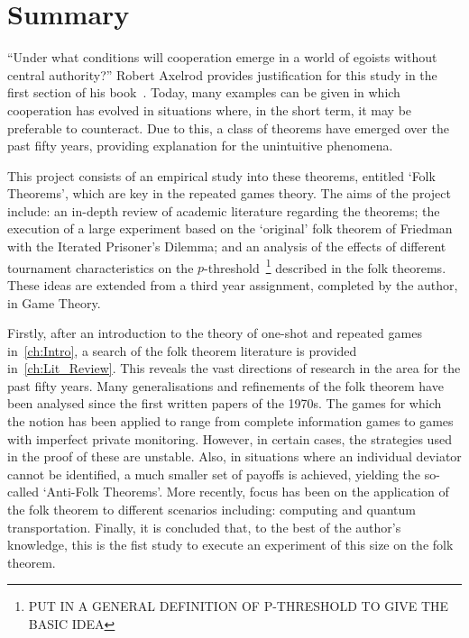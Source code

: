 \chapter{Summary}
``Under what conditions will cooperation emerge in a world of egoists without
central authority?'' Robert Axelrod provides justification for this study in
the first section of his book~\cite{Axelrod1984a}. Today, many examples can be
given in which cooperation has evolved in situations where, in the short term,
it may be preferable to counteract. Due to this, a class of theorems have
emerged over the past fifty years, providing explanation for the unintuitive
phenomena.

This project consists of an empirical study into these theorems, entitled
`Folk Theorems', which are key in the repeated games theory. The aims of
the project include: an in-depth review of academic literature regarding the
theorems; the execution of a large experiment based on the
`original' folk theorem of Friedman~\cite{Friedman1971} with the Iterated
Prisoner's Dilemma; and an analysis of the effects of different tournament
characteristics on the \(p\)-threshold~\footnote{PUT IN A GENERAL DEFINITION OF
P-THRESHOLD TO GIVE THE BASIC IDEA} described in the folk theorems. These
ideas are extended from a third year assignment, completed by the
author, in Game Theory.

Firstly, after an introduction to the theory of one-shot and repeated games in~\autoref{ch:Intro}, a
search of the folk theorem literature is provided in~\autoref{ch:Lit_Review}. This reveals the vast
directions of research in the area for the past fifty years. Many
generalisations and refinements of the folk theorem have been analysed since the
first written papers of the 1970s. The games for which the notion has been
applied to range from complete information games to games with imperfect
private monitoring. However, in certain cases, the strategies used in the proof
of these are unstable. Also, in situations where an individual deviator cannot
be identified, a much smaller set of payoffs is achieved, yielding the
so-called `Anti-Folk Theorems'. More recently, focus has been on the application
of the folk theorem to different scenarios including: computing and quantum transportation.
Finally, it is concluded that, to the best of the author's knowledge, this is
the fist study to execute an experiment of this size on the folk theorem.

